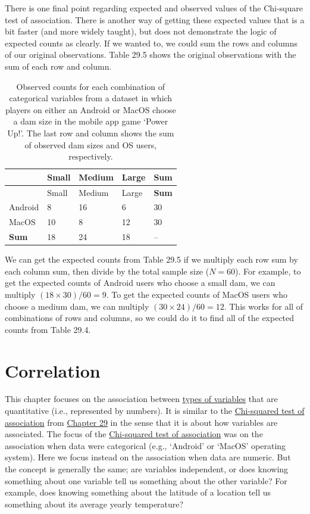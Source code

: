 \documentclass[
]{scrbook}
\begin{document}
There is one final point regarding expected and observed values of the Chi-square test of association.
There is another way of getting these expected values that is a bit faster (and more widely taught), but does not demonstrate the logic of expected counts as clearly.
If we wanted to, we could sum the rows and columns of our original observations.
Table 29.5 shows the original observations with the sum of each row and column.

\begin{longtable}[]{@{}lllll@{}}
\caption{\label{tab:unnamed-chunk-143}Observed counts for each combination of categorical variables from a dataset in which players on either an Android or MacOS choose a dam size in the mobile app game `Power Up!'. The last row and column shows the sum of observed dam sizes and OS users, respectively.}\tabularnewline
\toprule
& Small & Medium & Large & \textbf{Sum} \\
\midrule
\endfirsthead
\toprule
& Small & Medium & Large & \textbf{Sum} \\
\midrule
\endhead
Android & 8 & 16 & 6 & 30 \\
MacOS & 10 & 8 & 12 & 30 \\
\textbf{Sum} & 18 & 24 & 18 & -- \\
\bottomrule
\end{longtable}

We can get the expected counts from Table 29.5 if we multiply each row sum by each column sum, then divide by the total sample size (\(N = 60\)).
For example, to get the expected counts of Android users who choose a small dam, we can multiply \((18 \times 30)/60 = 9\).
To get the expected counts of MacOS users who choose a medium dam, we can multiply \((30 \times 24)/60 = 12\).
This works for all of combinations of rows and columns, so we could do it to find all of the expected counts from Table 29.4.

\hypertarget{Chapter_30}{%
\chapter{Correlation}\label{Chapter_30}}

This chapter focuses on the association between \protect\hyperlink{Chapter_5}{types of variables} that are quantitative (i.e., represented by numbers).
It is similar to the \protect\hyperlink{chi-squared-test-of-association}{Chi-squared test of association} from \protect\hyperlink{Chapter_29}{Chapter 29} in the sense that it is about how variables are associated.
The focus of the \protect\hyperlink{chi-squared-test-of-association}{Chi-squared test of association} was on the association when data were categorical (e.g., `Android' or `MacOS' operating system).
Here we focus instead on the association when data are numeric.
But the concept is generally the same; are variables independent, or does knowing something about one variable tell us something about the other variable?
For example, does knowing something about the latitude of a location tell us something about its average yearly temperature?
\end{document}
